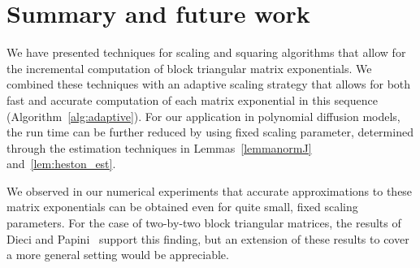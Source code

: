 \section{Summary and future work}


We have presented techniques for scaling and squaring algorithms that
allow for the incremental computation of block triangular matrix
exponentials.  We combined these techniques with an adaptive scaling
strategy that allows for both fast and accurate computation of each
matrix exponential in this sequence (Algorithm~\ref{alg:adaptive}).
For our application in polynomial diffusion models, the run time can
be further reduced by using fixed scaling parameter, determined
through the estimation techniques in Lemmas~\ref{lemmanormJ}
and~\ref{lem:heston_est}.

We observed in our numerical experiments that accurate approximations
to these matrix exponentials can be obtained even for quite small,
fixed scaling parameters.  For the case of two-by-two block triangular
matrices, the results of Dieci and Papini~\cite{Dieci2000,Dieci2001}
support this finding, but an extension of these results to cover a
more general setting would be appreciable.




